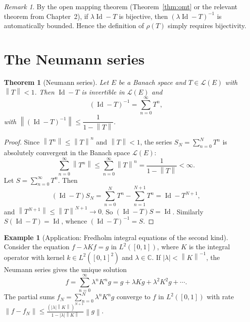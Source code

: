 \documentclass[a4paper,12pt]{book}
\DeclareMathOperator{\Id}{Id}
\newcommand{\C}{\mathbb{C}}
\newcommand{\norm}[1]{\left\| #1 \right\|}
\newcommand{\abs}[1]{\left| #1 \right|}
\theoremstyle{definition}
\newtheorem{example}[definition]{Example}
\theoremstyle{plain}
\newtheorem{theorem}[definition]{Theorem}
\theoremstyle{remark}
\newtheorem{remark}[definition]{Remark}
\begin{document}
\begin{remark}\label{rem:bdd-inverse-auto}
By the open mapping theorem (Theorem~\ref{thm:omt} or the relevant
theorem from Chapter~2), if $\lambda\Id-T$ is bijective, then
$(\lambda\Id-T)^{-1}$ is automatically bounded. Hence the definition of
$\rho(T)$ simply requires bijectivity.
\end{remark}

\section{The Neumann series}\label{sec:neumann-series}

\begin{theorem}[Neumann series]\label{thm:neumann}
Let $E$ be a Banach space and $T\in\mathcal{L}(E)$ with $\norm{T}<1$. Then
$\Id-T$ is invertible in $\mathcal{L}(E)$ and
\[
  (\Id-T)^{-1} = \sum_{n=0}^{\infty} T^n,
\]
with $\norm{(\Id-T)^{-1}} \leq \dfrac{1}{1-\norm{T}}$.
\end{theorem}

\begin{proof}
Since $\norm{T^n}\leq\norm{T}^n$ and $\norm{T}<1$, the series
$S_N = \sum_{n=0}^{N}T^n$ is absolutely convergent in the Banach space
$\mathcal{L}(E)$:
\[
  \sum_{n=0}^{\infty}\norm{T^n} \leq \sum_{n=0}^{\infty}\norm{T}^n
  = \frac{1}{1-\norm{T}} < \infty.
\]
Let $S = \sum_{n=0}^{\infty}T^n$. Then
\[
  (\Id - T)S_N = \sum_{n=0}^{N}T^n - \sum_{n=1}^{N+1}T^n = \Id - T^{N+1},
\]
and $\norm{T^{N+1}}\leq\norm{T}^{N+1}\to 0$. So $(\Id-T)S = \Id$. Similarly
$S(\Id-T)=\Id$, whence $(\Id-T)^{-1}=S$.
\end{proof}

\begin{example}[Application: Fredholm integral equations of the second kind]
\label{ex:neumann-fredholm}
Consider the equation $f - \lambda K f = g$ in $L^2([0,1])$, where $K$ is the
integral operator with kernel $k\in L^2([0,1]^2)$ and $\lambda\in\C$. If
$\abs{\lambda}<\norm{K}^{-1}$, the Neumann series gives the unique solution
\[
  f = \sum_{n=0}^{\infty}\lambda^n K^n g = g + \lambda Kg + \lambda^2 K^2 g + \cdots.
\]
The partial sums $f_N = \sum_{n=0}^{N}\lambda^n K^n g$ converge to $f$ in
$L^2([0,1])$ with rate $\norm{f-f_N}\leq\frac{(\abs{\lambda}\norm{K})^{N+1}}{1-\abs{\lambda}\norm{K}}\norm{g}$.
\end{example}
\end{document}
